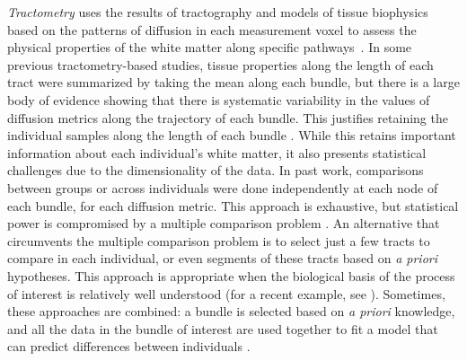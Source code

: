 \documentclass[10pt,%
               aps,%
               prl,%
               reprint,%
               superscriptaddress,%
               preprintnumbers,%
               linenumbers,%
               amsmath,%
               floatfix]{revtex4-1}
\begin{document}
\emph{Tractometry} uses the results of tractography and models
of tissue biophysics based on the patterns of diffusion in each measurement
voxel to assess the physical properties of the white matter along specific
pathways~\cite{Jones2005-yq, Bells2011-cf}.
In some previous tractometry-based studies, tissue properties along the
length of each tract were summarized by taking the mean along each
bundle, but there is a large body of evidence showing that there is
systematic variability in the values of diffusion metrics along the
trajectory of each bundle. This justifies retaining the individual
samples along the length of each bundle \cite{yeatman2012tract,
colby2012, ODonnell2009-uu}. While this retains important information
about each individual's white matter, it also presents statistical
challenges due to the dimensionality of the data. In past work,
comparisons between groups or across individuals were done
independently at each node of each bundle, for each
diffusion metric. This approach is exhaustive, but
statistical power is compromised by a multiple comparison problem
\cite{colby2012, Nichols2002-zu, Nichols2003-yy}. An alternative that
circumvents the multiple comparison problem is to select just a few
tracts to compare in each individual, or even
segments of these tracts based on \emph{a priori} hypotheses. This
approach is appropriate when the biological basis of the process
of interest is relatively well understood (for a recent example, see
\cite{huber2018rapid}). Sometimes, these approaches are combined: a
bundle is selected based on \emph{a priori} knowledge, and all the data
in the bundle of interest are used together to fit a model that can
predict differences between individuals \cite{dayan2016profilometry}.
\end{document}
